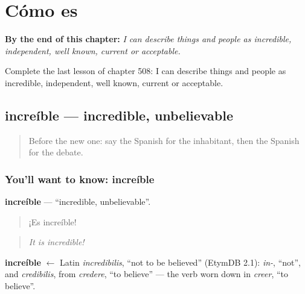 
\chapter{Cómo es}
\label{ch:es-como-es}

\begin{chapteropening}
\textbf{By the end of this chapter:} \emph{I can describe things and people as incredible, independent, well known, current or acceptable.}

Complete the last lesson of chapter 508: I can describe things and people as incredible, independent, well known, current or acceptable.
\end{chapteropening}

\section[increíble]{increíble — incredible, unbelievable}

\label{lesson:ES-C508-increible}



\begin{quote}
Before the new one: say the Spanish for the inhabitant, then the Spanish for the debate.
\end{quote}

\subsection*{You'll want to know: increíble}
\textbf{increíble} — \textquotedblleft{}incredible, unbelievable\textquotedblright{}.

\begin{quote}
¡Es increíble!
\end{quote}

\begin{quote}
\emph{It is incredible!}
\end{quote}

\begin{cousinweb}
\textbf{increíble} $\leftarrow$ Latin \emph{incredibilis}, \textquotedblleft{}not to be believed\textquotedblright{} (EtymDB 2.1): \emph{in-}, \textquotedblleft{}not\textquotedblright{}, and \emph{credibilis}, from \emph{credere}, \textquotedblleft{}to believe\textquotedblright{} — the verb worn down in \emph{creer}, \textquotedblleft{}to believe\textquotedblright{}.
\end{cousinweb}

